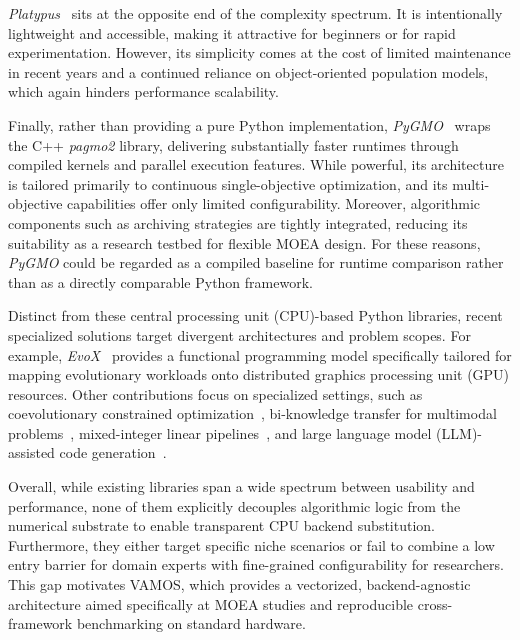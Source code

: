 \documentclass[journal]{IEEEtran}
\newcommand{\VAMOS}{VAMOS}
\begin{document}
\textit{Platypus}~\cite{hadka15} sits at the opposite end of the complexity spectrum. It is intentionally lightweight and accessible, making it attractive for beginners or for rapid experimentation. However, its simplicity comes at the cost of limited maintenance in recent years and a continued reliance on object-oriented population models, which again hinders performance scalability.

Finally, rather than providing a pure Python implementation, \textit{PyGMO}~\cite{BI20} wraps the C++ \textit{pagmo2} library, delivering substantially faster runtimes through compiled kernels and parallel execution features. While powerful, its architecture is tailored primarily to continuous single-objective optimization, and its multi-objective capabilities offer only limited configurability. Moreover, algorithmic components such as archiving strategies are tightly integrated, reducing its suitability as a research testbed for flexible MOEA design. For these reasons, \textit{PyGMO} could be regarded as a compiled baseline for runtime comparison rather than as a directly comparable Python framework.

Distinct from these central processing unit (CPU)-based Python libraries, recent specialized solutions target divergent architectures and problem scopes. For example, \textit{EvoX}~\cite{HCL+25} provides a functional programming model specifically tailored for mapping evolutionary workloads onto distributed graphics processing unit (GPU) resources. Other contributions focus on specialized settings, such as coevolutionary constrained optimization~\cite{TZX+21}, bi-knowledge transfer for multimodal problems~\cite{ZNL+26}, mixed-integer linear pipelines~\cite{YXC26}, and large language model (LLM)-assisted code generation~\cite{MGG+26}. 

Overall, while existing libraries span a wide spectrum between usability and performance, none of them explicitly decouples algorithmic logic from the numerical substrate to enable transparent CPU backend substitution. Furthermore, they either target specific niche scenarios or fail to combine a low entry barrier for domain experts with fine-grained configurability for researchers. This gap motivates \VAMOS{}, which provides a vectorized, backend-agnostic architecture aimed specifically at MOEA studies and reproducible cross-framework benchmarking on standard hardware.
\end{document}
